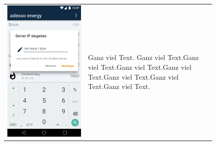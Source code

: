 \begin{figure}[h]
\begin{tabularx}{\textwidth}{X | X}
	\includegraphics[scale = 0.22]{img/AndroidMockup/serverLocation} & Ganz viel Text. Ganz viel Text.Ganz viel Text.Ganz viel Text.Ganz viel Text.Ganz viel Text.Ganz viel Text.Ganz viel Text.
\end{tabularx}
\end{figure}



